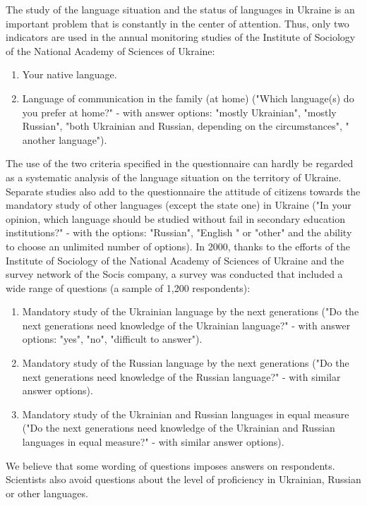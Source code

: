 \documentclass[english]{textolivre}
\begin{document}
The study of the language situation and the status of languages ​​in Ukraine is an important problem that is constantly in the center of attention. Thus, only two indicators are used in the annual monitoring studies of the Institute of Sociology of the National Academy of Sciences of Ukraine:

\begin{enumerate}
 \item Your native language.
 \item Language of communication in the family (at home) ("Which language(s) do you prefer at home?" - with answer options: "mostly Ukrainian", "mostly Russian", "both Ukrainian and Russian, depending on the circumstances", " another language").
\end{enumerate}

The use of the two criteria specified in the questionnaire can hardly be regarded as a systematic analysis of the language situation on the territory of Ukraine. Separate studies also add to the questionnaire the attitude of citizens towards the mandatory study of other languages (except the state one) in Ukraine ("In your opinion, which language should be studied without fail in secondary education institutions?" - with the options: "Russian", "English " or "other" and the ability to choose an unlimited number of options). In 2000, thanks to the efforts of the Institute of Sociology of the National Academy of Sciences of Ukraine and the survey network of the Socis company, a survey was conducted that included a wide range of questions (a sample of 1,200 respondents):

\begin{enumerate}
 \item Mandatory study of the Ukrainian language by the next generations ("Do the next generations need knowledge of the Ukrainian language?" - with answer options: "yes", "no", "difficult to answer").
 \item Mandatory study of the Russian language by the next generations ("Do the next generations need knowledge of the Russian language?" - with similar answer options).
 \item Mandatory study of the Ukrainian and Russian languages in equal measure ("Do the next generations need knowledge of the Ukrainian and Russian languages in equal measure?" - with similar answer options).
\end{enumerate}

We believe that some wording of questions imposes answers on respondents. Scientists also avoid questions about the level of proficiency in Ukrainian, Russian or other languages.
\end{document}
